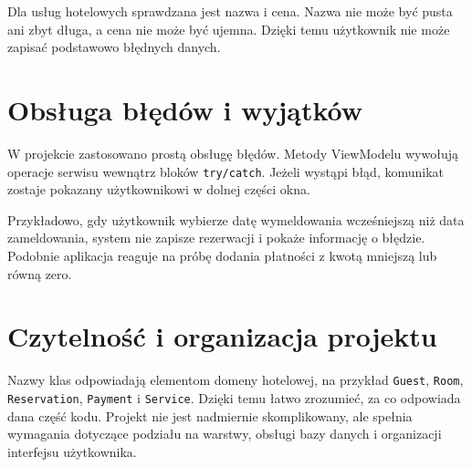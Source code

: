 Dla usług hotelowych sprawdzana jest nazwa i cena. Nazwa nie może być pusta ani zbyt długa, a cena nie może być ujemna. Dzięki temu użytkownik nie może zapisać podstawowo błędnych danych.

\section{Obsługa błędów i wyjątków}

W projekcie zastosowano prostą obsługę błędów. Metody ViewModelu wywołują operacje serwisu wewnątrz bloków \texttt{try/catch}. Jeżeli wystąpi błąd, komunikat zostaje pokazany użytkownikowi w dolnej części okna.

Przykładowo, gdy użytkownik wybierze datę wymeldowania wcześniejszą niż data zameldowania, system nie zapisze rezerwacji i pokaże informację o błędzie. Podobnie aplikacja reaguje na próbę dodania płatności z kwotą mniejszą lub równą zero.

\section{Czytelność i organizacja projektu}

Nazwy klas odpowiadają elementom domeny hotelowej, na przykład \texttt{Guest}, \texttt{Room}, \texttt{Reservation}, \texttt{Payment} i \texttt{Service}. Dzięki temu łatwo zrozumieć, za co odpowiada dana część kodu. Projekt nie jest nadmiernie skomplikowany, ale spełnia wymagania dotyczące podziału na warstwy, obsługi bazy danych i organizacji interfejsu użytkownika.
